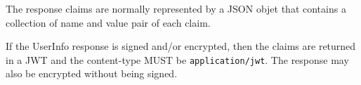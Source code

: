 The response claims are normally represented by a JSON objet that contains a
collection of name and value pair of each claim.

If the UserInfo response is signed and/or encrypted, then the claims are
returned in a JWT and the content-type MUST be \texttt{application/jwt}.
The response may also be encrypted without being signed.



